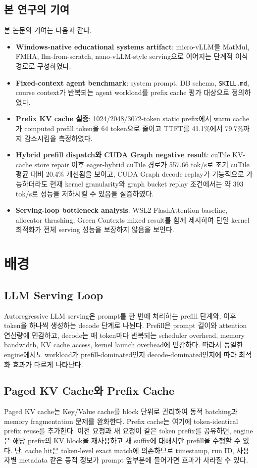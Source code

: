 \documentclass{kcc}
\begin{document}
\subsection{본 연구의 기여}
본 논문의 기여는 다음과 같다.
\begin{itemize}
\item \textbf{Windows-native educational systems artifact}: micro-vLLM을 MatMul, FMHA, llm-from-scratch, nano-vLLM-style serving으로 이어지는 단계적 이식 경로로 구성하였다.
\item \textbf{Fixed-context agent benchmark}: system prompt, DB schema, \texttt{SKILL.md}, course context가 반복되는 agent workload를 prefix cache 평가 대상으로 정의하였다.
\item \textbf{Prefix KV cache 실증}: 1024/2048/3072-token static prefix에서 warm cache가 computed prefill token을 64 token으로 줄이고 TTFT를 41.1\%에서 79.7\%까지 감소시킴을 측정하였다.
\item \textbf{Hybrid prefill dispatch와 CUDA Graph negative result}: cuTile KV-cache store repair 이후 eager-hybrid cuTile 경로가 557.66 tok/s로 초기 cuTile 평균 대비 20.4\% 개선됨을 보이고, CUDA Graph decode replay가 기능적으로 가능하더라도 현재 kernel granularity와 graph bucket replay 조건에서는 약 393 tok/s로 성능을 저하시킬 수 있음을 실증하였다.
\item \textbf{Serving-loop bottleneck analysis}: WSL2 FlashAttention baseline, allocator thrashing, Green Contexts mixed result를 함께 제시하여 단일 kernel 최적화가 전체 serving 성능을 보장하지 않음을 보인다.
\end{itemize}

\section{배경}
\subsection{LLM Serving Loop}
Autoregressive LLM serving은 prompt를 한 번에 처리하는 prefill 단계와, 이후 token을 하나씩 생성하는 decode 단계로 나뉜다. Prefill은 prompt 길이와 attention 연산량에 민감하고, decode는 매 token마다 반복되는 scheduler overhead, memory bandwidth, KV cache access, kernel launch overhead에 민감하다. 따라서 동일한 engine에서도 workload가 prefill-dominated인지 decode-dominated인지에 따라 최적화 효과가 다르게 나타난다.

\subsection{Paged KV Cache와 Prefix Cache}
Paged KV cache는 Key/Value cache를 block 단위로 관리하여 동적 batching과 memory fragmentation 문제를 완화한다. Prefix cache는 여기에 token-identical prefix reuse를 추가한다. 이전 요청과 새 요청이 같은 token prefix를 공유하면, engine은 해당 prefix의 KV block을 재사용하고 새 suffix에 대해서만 prefill을 수행할 수 있다. 단, cache hit은 token-level exact match에 의존하므로 timestamp, run ID, 사용자별 metadata 같은 동적 정보가 prompt 앞부분에 들어가면 효과가 사라질 수 있다.
\end{document}
